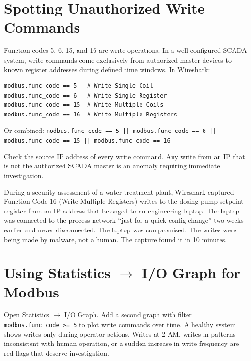 \documentclass[12pt,twoside,openright]{memoir}
\newcommand{\filter}[1]{\texttt{\color{wsblue}#1}}
\begin{document}
\section{Spotting Unauthorized Write Commands}

Function codes 5, 6, 15, and 16 are write operations. In a well-configured SCADA system, write commands come exclusively from authorized master devices to known register addresses during defined time windows. In Wireshark:

\begin{filterbox}
\begin{lstlisting}
modbus.func_code == 5   # Write Single Coil
modbus.func_code == 6   # Write Single Register
modbus.func_code == 15  # Write Multiple Coils
modbus.func_code == 16  # Write Multiple Registers
\end{lstlisting}
Or combined: \filter{modbus.func\_code == 5 || modbus.func\_code == 6 || modbus.func\_code == 15 || modbus.func\_code == 16}
\end{filterbox}

Check the source IP address of every write command. Any write from an IP that is not the authorized SCADA master is an anomaly requiring immediate investigation.

\begin{fieldnote}
During a security assessment of a water treatment plant, Wireshark captured Function Code 16 (Write Multiple Registers) writes to the dosing pump setpoint register from an IP address that belonged to an engineering laptop. The laptop was connected to the process network ``just for a quick config change'' two weeks earlier and never disconnected. The laptop was compromised. The writes were being made by malware, not a human. The capture found it in 10 minutes.
\end{fieldnote}

\section{Using Statistics $\to$ I/O Graph for Modbus}

Open Statistics $\to$ I/O Graph. Add a second graph with filter \filter{modbus.func\_code >= 5} to plot write commands over time. A healthy system shows writes only during operator actions. Writes at 2 AM, writes in patterns inconsistent with human operation, or a sudden increase in write frequency are red flags that deserve investigation.

\end{document}
